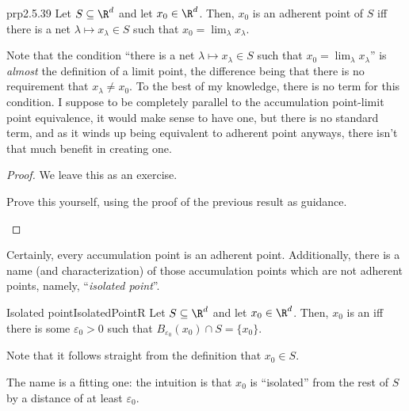 \begin{prp}{}{prp2.5.39}
Let $S\subseteq \R ^d$ and let $x_0\in \R ^d$.  Then, $x_0$ is an adherent point of $S$ iff there is a net $\lambda \mapsto x_{\lambda} \in S$ such that $x_0=\lim _{\lambda}x_{\lambda}$.
\begin{rmk}
Note that the condition ``there is a net $\lambda \mapsto x_{\lambda}\in S$ such that $x_0=\lim _{\lambda}x_{\lambda}$'' is \emph{almost} the definition of a limit point, the difference being that there is no requirement that $x_{\lambda}\neq x_0$.  To the best of my knowledge, there is no term for this condition.  I suppose to be completely parallel to the accumulation point-limit point equivalence, it would make sense to have one, but there is no standard term, and as it winds up being equivalent to adherent point anyways, there isn't that much benefit in creating one.
\end{rmk}
\begin{proof}
We leave this as an exercise.
\begin{exr}{}{}
Prove this yourself, using the proof of the previous result as guidance.
\end{exr}
\end{proof}
\end{prp}
Certainly, every accumulation point is an adherent point.  Additionally, there is a name (and characterization) of those accumulation points which are not adherent points, namely, ``\emph{isolated point}''.
\begin{dfn}{Isolated point}{IsolatedPointR}
Let $S\subseteq \R ^d$ and let $x_0\in \R ^d$.  Then, $x_0$ is an  iff there is some $\varepsilon _0>0$ such that $B_{\varepsilon _0}(x_0)\cap S=\{ x_0\}$.
\begin{rmk}
Note that it follows straight from the definition that $x_0\in S$.
\end{rmk}
\begin{rmk}
The name is a fitting one:  the intuition is that $x_0$ is ``isolated'' from the rest of $S$ by a distance of at least $\varepsilon _0$.
\end{rmk}
\end{dfn}
